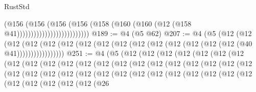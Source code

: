 \begin{lexlean}{RustStd}
\begin{coremodule}
                                      (@156
                                        (@156
                                          (@156
                                            (@156
                                              (@158
                                                (@160 (@160 (@12 (@158 @41))))))))))))))))))))))))))
@189 := @4 (@5 @62)
@207 := @4
    (@5
      (@12
        (@12
          (@12 (@12 (@12 (@12 (@12 (@12 (@12 (@12 (@12 (@12 (@12 (@12 (@12 (@40 @41)))))))))))))))))
@251 := @4
    (@5
      (@12
        (@12
          (@12
            (@12
              (@12
                (@12
                  (@12
                    (@12
                      (@12
                        (@12
                          (@12
                            (@12
                              (@12
                                (@12
                                  (@12
                                    (@12
                                      (@12
                                        (@12
                                          (@12
                                            (@12
                                              (@12
                                                (@12
                                                  (@12
                                                    (@12
                                                      (@12
                                                        (@12
                                                          (@12
                                                            (@12
                                                              (@12
                                                                (@12
                                                                  (@12
                                                                    (@12
                                                                      (@12
                                                                        (@12
                                                                          (@12
                                                                            (@12
                                                                              (@12
                                                                                (@12
                                                                                  (@12
                                                                                    (@12
                                                                                      (@26

\end{coremodule}
\end{lexlean}
